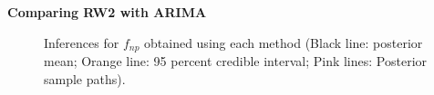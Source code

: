 \documentclass{beamer} %
\begin{document}
\begin{frame}
\textbf{Comparing RW2 with ARIMA}

\begin{figure}[p]
    \centering
     \caption{\fontsize{9}{11}\selectfont Inferences for $f_{np}$ obtained using each method (Black line: posterior mean; Orange line: 95 percent credible interval; Pink lines: Posterior sample paths). }
    \label{fig:comparingTwoG_realdata}
\end{figure}
\end{frame}
\end{document}
